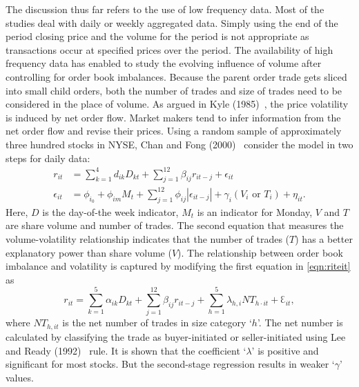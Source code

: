 The discussion thus far refers to the use of low frequency data. Most of the studies deal with daily or weekly aggregated data. Simply using the end of the period closing price and the volume for the period is not appropriate as transactions occur at specified prices over the period. The availability of high frequency data has enabled to study the evolving influence of volume after controlling for order book imbalances. Because the parent order trade gets sliced into small child orders, both the number of trades and size of trades need to be considered in the place of volume. As argued in Kyle (1985)~\cite{kyle1985}, the price volatility is induced by net order flow. Market makers tend to infer information from the net order flow and revise their prices. Using a random sample of approximately three hundred stocks in NYSE, Chan and Fong (2000)~\cite{chanfong} consider the model in two steps for daily data: 
	\begin{equation} \label{eqn:riteit}
	\begin{split}
	r_{it} &= \sum_{k=1}^4 d_{ik} D_{kt} + \sum_{j=1}^{12} \beta_{ij} r_{it-j} + \epsilon_{it} \\
	\epsilon_{it} &= \phi_{i_0} + \phi_{im} M_t + \sum_{j=1}^{12} \phi_{ij} |\epsilon_{it-j}| + \gamma_i (V_i \text{ or }T_i) + \eta_{it}.
	\end{split}
	\end{equation}
Here, $D$ is the day-of-the week indicator, $M_t$ is an indicator for Monday, $V$ and $T$ are share volume and number of trades. The second equation that measures the volume-volatility relationship indicates that the number of trades ($T$) has a better explanatory power than share volume ($V$). The relationship between order book imbalance and volatility is captured by modifying the first equation in \eqref{eqn:riteit} as
	\begin{equation} \label{eqn:rit32}
	r_{it}= \sum_{k=1}^5 \alpha_{ik} D_{kt} + \sum_{j=1}^{12} \beta_{ij} r_{it-j} + \sum_{h=1}^5 \lambda_{h,i} N T_{h\cdot it} + \Eulerconst_{it},
	\end{equation}
where $NT_{h,it}$ is the net number of trades in size category `$h$'. The net number is calculated by classifying the trade as buyer-initiated or seller-initiated using Lee and Ready (1992)~\cite{leeready} rule. It is shown that the coefficient `$\lambda$' is positive and significant for most stocks. But the second-stage regression results in weaker `$\gamma$' values. 


